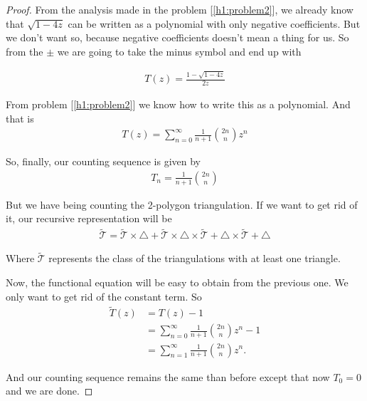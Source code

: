 \begin{proof}
    From the analysis made in the problem [\ref{h1:problem2}], we already know that $\sqrt{1 - 4z}$ can be written as a polynomial with only
    negative coefficients. But we don't want so, because negative coefficients doesn't mean a thing for us. So from the $\pm$ we are going to
    take the minus symbol and end up with
    
    \begin{align}
        T(z) = \frac{1 - \sqrt{1 - 4z}}{2z}    
    \end{align}\pn
    
    From problem [\ref{h1:problem2}] we know how to write this as a polynomial. And that is
    \begin{align}
            T(z) = \sum_{n=0}^{\infty} \frac{1}{n+1} \binom{2n}{n} z^n
    \end{align}\pn
    
    So, finally, our counting sequence is given by
    \begin{align}
            T_n = \frac{1}{n+1} \binom{2n}{n}
    \end{align}\pn
    
    But we have being counting the 2-polygon triangulation. If we want to get rid of it, our recursive representation will be
    \begin{align}
        \tilde{\mathcal{T}} = \tilde{\mathcal{T}} \times \triangle + \tilde{\mathcal{T}} \times \triangle \times \tilde{\mathcal{T}} + \triangle \times \tilde{\mathcal{T}} + \triangle
    \end{align}\pn
    
    Where $\tilde{\mathcal{T}}$ represents the class of the triangulations with at least one triangle.\pn
    
    Now, the functional equation will be easy to obtain from the previous one. We only want to get rid of the constant term. So
    \begin{align}
        \tilde{T}(z)    &=  T(z)-1  \\
                        &=  \sum_{n=0}^{\infty} \frac{1}{n+1} \binom{2n}{n} z^n - 1 \\
                        &=  \sum_{n=1}^{\infty} \frac{1}{n+1} \binom{2n}{n} z^n. 
    \end{align}\pn
    
    And our counting sequence remains the same than before except that now $T_0 = 0$ and we are done.
\end{proof}